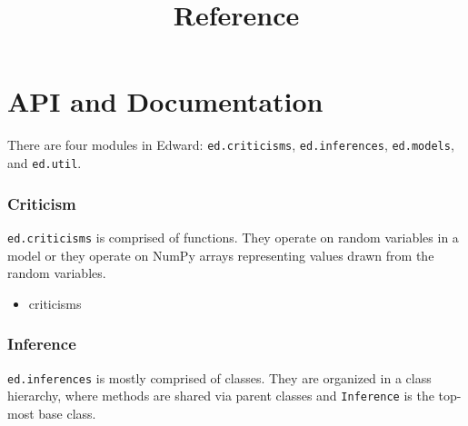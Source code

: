 \title{Reference}

\section{API and Documentation}

There are four modules in Edward:
\texttt{ed.criticisms},
\texttt{ed.inferences},
\texttt{ed.models},
and
\texttt{ed.util}.

\subsubsection{Criticism}

\texttt{ed.criticisms} is comprised of functions. They operate on
random variables in a model or they operate on NumPy arrays
representing values drawn from the random variables.

\begin{itemize}
  \item {{criticisms}}
\end{itemize}

\subsubsection{Inference}

\texttt{ed.inferences} is mostly comprised of classes. They are
organized in a class hierarchy, where methods are shared via parent
classes and \texttt{Inference} is the top-most base class.

